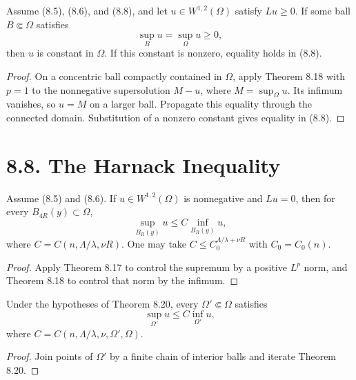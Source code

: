\begin{theorem}
\label{gt-thm-8-19-strong-maximum-principle}
Assume (8.5), (8.6), and (8.8), and let $u\in W^{1,2}(\Omega)$ satisfy
$Lu\geq0$. If some ball $B\Subset\Omega$ satisfies
\begin{equation}
\sup_Bu=\sup_\Omega u\geq0,
\tag{8.62}
\end{equation}
then $u$ is constant in $\Omega$. If this constant is nonzero, equality holds in
(8.8).
\end{theorem}
\begin{proof}
\sketch On a concentric ball compactly contained in $\Omega$, apply Theorem 8.18
with $p=1$ to the nonnegative supersolution $M-u$, where $M=\sup_\Omega u$.
Its infimum vanishes, so $u=M$ on a larger ball. Propagate this equality through
the connected domain. Substitution of a nonzero constant gives equality in (8.8).
\end{proof}

\section*{8.8. The Harnack Inequality}

\begin{theorem}
\label{gt-thm-8-20-harnack}
Assume (8.5) and (8.6). If $u\in W^{1,2}(\Omega)$ is nonnegative and
$Lu=0$, then for every $B_{4R}(y)\subset\Omega$,
\begin{equation}
\sup_{B_R(y)}u\leq C\inf_{B_R(y)}u,
\tag{8.63}
\end{equation}
where $C=C(n,\Lambda/\lambda,\nu R)$. One may take
$C\leq C_0^{\Lambda/\lambda+\nu R}$ with $C_0=C_0(n)$.
\end{theorem}
\begin{proof}
\sketch Apply Theorem 8.17 to control the supremum by a positive $L^p$ norm, and
Theorem 8.18 to control that norm by the infimum.
\end{proof}

\begin{corollary}
\label{gt-cor-8-21-harnack-subdomain}
Under the hypotheses of Theorem 8.20, every $\Omega'\Subset\Omega$ satisfies
\begin{equation}
\sup_{\Omega'}u\leq C\inf_{\Omega'}u,
\tag{8.64}
\end{equation}
where $C=C(n,\Lambda/\lambda,\nu,\Omega',\Omega)$.
\end{corollary}
\begin{proof}
\sketch Join points of $\Omega'$ by a finite chain of interior balls and iterate
Theorem 8.20.
\end{proof}

